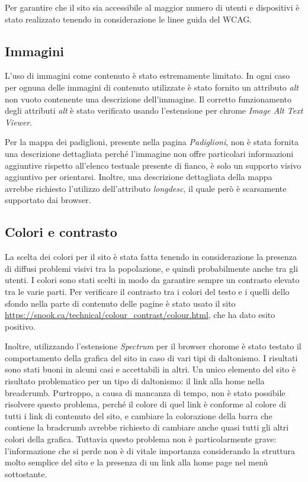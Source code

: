 Per garantire che il sito sia accessibile al maggior numero di utenti e dispositivi è stato realizzato tenendo in considerazione le linee guida del WCAG. \newline

\subsection{Immagini}
L'uso di immagini come contenuto è stato estremamente limitato. In ogni caso per ognuna delle immagini di contenuto utilizzate è stato fornito un attributo \textit{alt} non vuoto contenente una descrizione dell'immagine. Il corretto funzionamento degli attributi \textit{alt} è stato verificato usando l'estensione per chrome \textit{Image Alt Text Viewer}.

Per la mappa dei padiglioni, presente nella pagina \textit{Padiglioni}, non è stata fornita una descrizione dettagliata perché l'immagine non offre particolari informazioni aggiuntive rispetto all'elenco testuale presente di fianco, è solo un supporto visivo aggiuntivo per orientarsi. Inoltre, una descrizione dettagliata della mappa avrebbe richiesto l'utilizzo dell'attributo \textit{longdesc}, il quale però è scarsamente supportato dai browser.

\subsection{Colori e contrasto}
La scelta dei colori per il sito è stata fatta tenendo in considerazione la presenza di diffusi problemi visivi tra la popolazione, e quindi probabilmente anche tra gli utenti. I colori sono stati scelti in modo da garantire sempre un contrasto elevato tra le varie parti. Per verificare il contrasto tra i colori del testo e i quelli dello sfondo nella parte di contenuto delle pagine è stato usato il sito \url{https://snook.ca/technical/colour_contrast/colour.html}, che ha dato esito positivo.

Inoltre, utilizzando l'estensione \textit{Spectrum} per il browser chorome è stato testato il comportamento della grafica del sito in caso di vari tipi di daltonismo. I risultati sono stati buoni in alcuni casi e accettabili in altri. Un unico elemento del sito è risultato problematico per un tipo di daltonismo: il link alla home nella breadcrumb. Purtroppo, a causa di mancanza di tempo, non è stato possibile risolvere questo problema, perché il colore di quel link è conforme al colore di tutti i link di contenuto del sito, e cambiare la colorazione della barra che contiene la bradcrumb avrebbe richiesto di cambiare anche quasi tutti gli altri colori della grafica. Tuttavia questo problema non è particolarmente grave: l'informazione che si perde non è di vitale importanza considerando la struttura molto semplice del sito e la presenza di un link alla home page nel menù sottostante.

